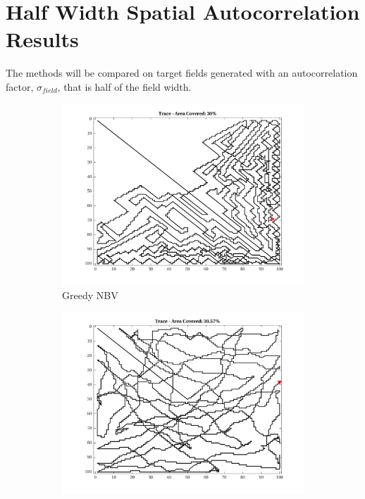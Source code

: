 
\section{Half Width Spatial Autocorrelation Results}
The methods will be compared on target fields generated with an autocorrelation factor, $\sigma_{field}$, that is half of the field width.
\begin{figure}[htb!]
    \centering
    \begin{subfigure}[t]{0.25\textwidth}
        \centering
        \includegraphics[width=\linewidth]{figures/path_greedy_30p_100x100_sf_50_seed_1.png}
        \captionsetup{skip=0.20\baselineskip,size=footnotesize}
        \caption{Greedy NBV}
    \end{subfigure}%
    \begin{subfigure}[t]{0.25\textwidth}
        \centering
        \includegraphics[width=\linewidth]{figures/path_mc_30p_100x100_sf_50_seed_1.png}

\end{subfigure}
\end{figure}
